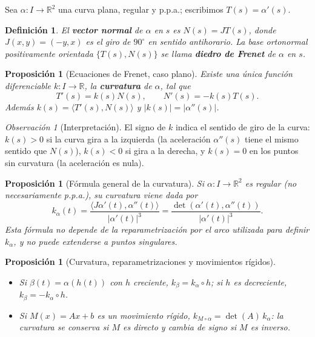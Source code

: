\documentclass[11pt]{article}
\theoremstyle{plain}
\newtheorem{definicion}[teorema]{Definición}
\newtheorem{proposicion}[teorema]{Proposición}
\theoremstyle{definition}
\theoremstyle{remark}
\newtheorem{observacion}[teorema]{Observación}
\begin{document}
Sea $\alpha:I\to\mathbb{R}^2$ una curva plana, regular y p.p.a.; escribimos $T(s)=\alpha'(s)$.

\begin{definicion}
El \textbf{vector normal} de $\alpha$ en $s$ es $N(s)=JT(s)$, donde $J(x,y)=(-y,x)$ es el giro de $90^\circ$ en sentido antihorario. La base ortonormal positivamente orientada $\{T(s),N(s)\}$ se llama \textbf{diedro de Frenet} de $\alpha$ en $s$.
\end{definicion}

\begin{proposicion}[Ecuaciones de Frenet, caso plano]
Existe una única función diferenciable $k:I\to\mathbb{R}$, la \textbf{curvatura} de $\alpha$, tal que
\[
\boxed{T'(s)=k(s)N(s), \qquad N'(s)=-k(s)T(s)}.
\]
Además $k(s)=\langle T'(s),N(s)\rangle$ y $|k(s)|=|\alpha''(s)|$.
\end{proposicion}

\begin{observacion}[Interpretación]
El signo de $k$ indica el sentido de giro de la curva: $k(s)>0$ si la curva gira a la izquierda (la aceleración $\alpha''(s)$ tiene el mismo sentido que $N(s)$), $k(s)<0$ si gira a la derecha, y $k(s)=0$ en los puntos sin curvatura (la aceleración es nula).
\end{observacion}

\begin{proposicion}[Fórmula general de la curvatura]
Si $\alpha:I\to\mathbb{R}^2$ es regular (no necesariamente p.p.a.), su curvatura viene dada por
\[
\boxed{k_\alpha(t)=\frac{\langle J\alpha'(t),\alpha''(t)\rangle}{|\alpha'(t)|^3}=\frac{\det(\alpha'(t),\alpha''(t))}{|\alpha'(t)|^3}}.
\]
Esta fórmula no depende de la reparametrización por el arco utilizada para definir $k_\alpha$, y no puede extenderse a puntos singulares.
\end{proposicion}

\begin{proposicion}[Curvatura, reparametrizaciones y movimientos rígidos]\
\begin{itemize}
\item Si $\beta(t)=\alpha(h(t))$ con $h$ creciente, $k_\beta=k_\alpha\circ h$; si $h$ es decreciente, $k_\beta=-k_\alpha\circ h$.
\item Si $M(x)=Ax+b$ es un movimiento rígido, $k_{M\circ\alpha}=\det(A)\,k_\alpha$: la curvatura se conserva si $M$ es directo y cambia de signo si $M$ es inverso.
\end{itemize}
\end{proposicion}
\end{document}
